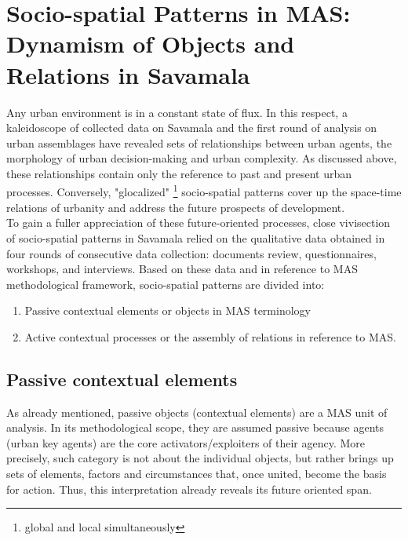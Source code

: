 \documentclass[11pt]{report}
\begin{document}
\section{Socio-spatial Patterns in MAS: Dynamism of Objects and Relations in Savamala}

Any urban environment is in a constant state of flux.
In this respect, a kaleidoscope of collected data on Savamala and the first round of analysis on urban assemblages have revealed sets of relationships between urban agents, the morphology of urban decision-making and urban complexity.
As discussed above, these relationships contain only the reference to past and present urban processes.
Conversely, "glocalized"
\footnote{global and local simultaneously}
socio-spatial patterns cover up the space-time relations of urbanity and address the future prospects of development.
\\

To gain a fuller appreciation of these future-oriented processes, close vivisection of socio-spatial patterns in Savamala relied on the qualitative data obtained in four rounds of consecutive data collection:
documents review, questionnaires, workshops, and interviews.
Based on these data and in reference to MAS methodological framework, socio-spatial patterns are divided into:

\begin{enumerate}
\item Passive contextual elements or objects in MAS terminology
\item Active contextual processes or the assembly of relations in reference to MAS.
\end{enumerate}

\subsection{Passive contextual elements}

As already mentioned, passive objects (contextual elements) are a MAS unit of analysis.
In its methodological scope, they are assumed passive because agents (urban key agents) are the core activators/exploiters of their agency.
More precisely, such category is not about the individual objects, but rather brings up sets of elements, factors and circumstances that, once united, become the basis for action. Thus, this interpretation already reveals its future oriented span. 
\\
\end{document}
